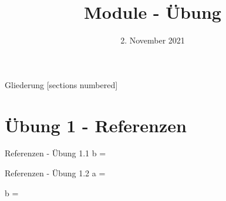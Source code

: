 



\title{Module - Übung}
\date{2. November 2021}


\maketitle

\begin{frame}{Gliederung}
	[sections numbered]
	\tableofcontents
\end{frame}

\section{Übung 1 - Referenzen}
\begin{frame}{Referenzen - Übung 1.1}
	\large
	b = \only<2>{\alert{2}}
\end{frame}
\begin{frame}{Referenzen - Übung 1.2}
	\large
	a = \only<1>{?}\only<2>{\alert{[1, 2, [1, 2, [1, 2, ...]]]}}
	
	b = \only<2>{\alert{1}}
\end{frame}



